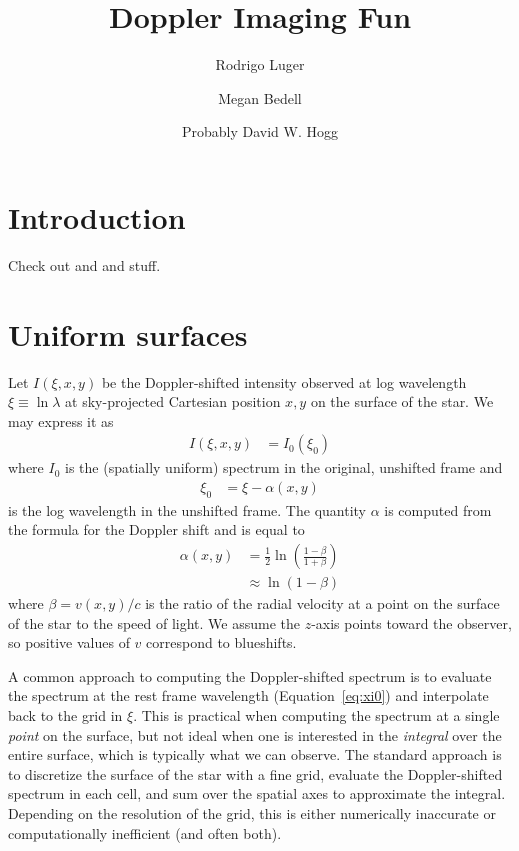 \documentclass[modern]{aastex62}
\begin{document}
\title{Doppler Imaging Fun}

\author[0000-0002-0296-3826]{Rodrigo Luger}
%
\author{Megan Bedell}
%
\author{Probably David W. Hogg}

%
\section{Introduction}
Check out \citet{Luger2019} and \citet{Bedell2019} and stuff.

%
\section{Uniform surfaces}
\label{sec:uniform surfaces}

Let $I(\xi, x, y)$ be the Doppler-shifted intensity observed at log wavelength 
$\xi \equiv \ln\lambda$ at sky-projected Cartesian position $x, y$ on the 
surface of the star. We may express it as
%
\begin{align}
    \label{eq:IntensityUnif}
    I(\xi, x, y) &= I_0(\xi_0)
\end{align}
%
where $I_0$ is the (spatially uniform) spectrum in the original, unshifted 
frame and 
%
\begin{align}
    \label{eq:xi0}
    \xi_0 &= \xi - \alpha(x, y)
\end{align}
%
is the log wavelength in the unshifted frame. The quantity $\alpha$ is
computed from the formula for the Doppler shift and is equal to
%
\begin{align}
    \alpha(x, y) 
        &=
        \frac{1}{2}\ln\left( 
            \frac{1 - \beta}{1 + \beta} 
        \right) \nonumber \\
        &\approx
        \ln(1 - \beta)
\end{align}
%
where $\beta = v(x, y) / c$ is the ratio of the 
radial velocity at a point on 
the surface of the star to the speed of light. We assume the
$z$-axis points toward the observer, so positive values of $v$ correspond
to blueshifts.

A common approach to computing the Doppler-shifted spectrum is to
evaluate the spectrum at the rest frame wavelength (Equation~\ref{eq:xi0})
and interpolate back to the grid in $\xi$. This is practical when
computing the spectrum at a single \emph{point} on the surface, but not
ideal when one is interested in the \emph{integral} over the entire
surface, which is typically what we can observe. The standard approach is
to discretize the surface of the star with a fine grid, evaluate the
Doppler-shifted spectrum in each cell, and sum over the spatial axes
to approximate the integral. Depending on the resolution of the grid,
this is either numerically inaccurate or computationally inefficient 
(and often both).
\end{document}
